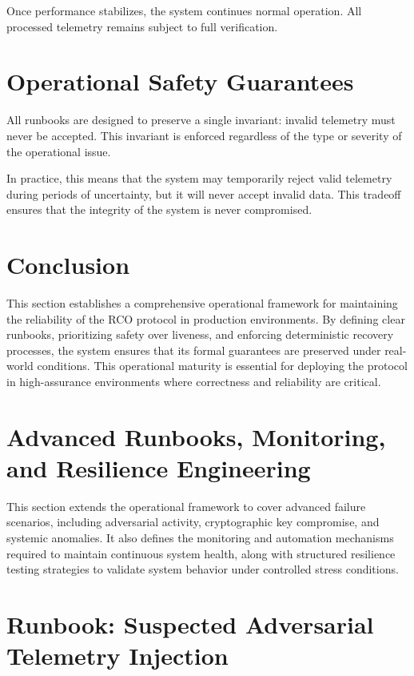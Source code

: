 Once performance stabilizes, the system continues normal operation. All processed telemetry remains subject to full verification.

\section{Operational Safety Guarantees}

All runbooks are designed to preserve a single invariant: invalid telemetry must never be accepted. This invariant is enforced regardless of the type or severity of the operational issue.

In practice, this means that the system may temporarily reject valid telemetry during periods of uncertainty, but it will never accept invalid data. This tradeoff ensures that the integrity of the system is never compromised.

\section{Conclusion}

This section establishes a comprehensive operational framework for maintaining the reliability of the RCO protocol in production environments. By defining clear runbooks, prioritizing safety over liveness, and enforcing deterministic recovery processes, the system ensures that its formal guarantees are preserved under real-world conditions. This operational maturity is essential for deploying the protocol in high-assurance environments where correctness and reliability are critical.

\section{Advanced Runbooks, Monitoring, and Resilience Engineering}

This section extends the operational framework to cover advanced failure scenarios, including adversarial activity, cryptographic key compromise, and systemic anomalies. It also defines the monitoring and automation mechanisms required to maintain continuous system health, along with structured resilience testing strategies to validate system behavior under controlled stress conditions.

\section{Runbook: Suspected Adversarial Telemetry Injection}

